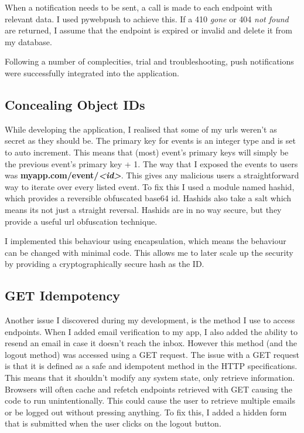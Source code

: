 \documentclass[a4paper,oneside,12pt]{report}
\begin{document}
	When a notification needs to be sent, a call is made to each endpoint with relevant data. I used pywebpush to achieve this. If a 410 \textit{gone} or 404 \textit{not found} are returned, I assume that the endpoint is expired or invalid and delete it from my database.
	
	Following a number of complecities, trial and troubleshooting, push notifications were successfully integrated into the application.

	\subsection{Concealing Object IDs}
	While developing the application, I realised that some of my urls weren’t as secret as they should be. The primary key for events is an integer type and is set to auto increment. This means that (most) event’s primary keys will simply be the previous event’s primary key + 1. The way that I exposed the events to users was \textbf{myapp.com/event/\textit{\textless id\textgreater}}. This gives any malicious users a straightforward way to iterate over every listed event. To fix this I used a module named hashid, which provides a reversible obfuscated base64 id. Hashids also take a salt which means its not just a straight reversal. Hashids are in no way secure, but they provide a useful url obfuscation technique.
	
	I implemented this behaviour using encapsulation, which means the behaviour can be changed with minimal code. This allows me to later scale up the security by providing a cryptographically secure hash as the ID.

	\subsection{GET Idempotency}
	Another issue I discovered during my development, is the method I use to access endpoints. When I added email verification to my app, I also added the ability to resend an email in case it doesn’t reach the inbox. However this method (and the logout method)  was accessed using a GET request. The issue with a GET request is that it is defined as a safe and idempotent method in the HTTP specifications. This means that it shouldn’t modify any system state, only retrieve information. Browsers will often cache and refetch endpoints retrieved with GET causing the code to run unintentionally. This could cause the user to retrieve multiple emails or be logged out without pressing anything. To fix this, I added a hidden form that is submitted when the user clicks on the logout button.
\end{document}
